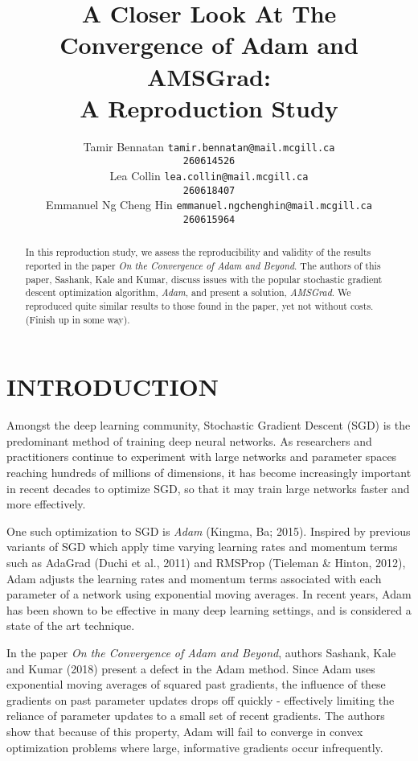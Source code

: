 \documentclass[letterpaper, 10 pt, conference]{ieeeconf}  %
\title{\LARGE \bf
A Closer Look At The Convergence of Adam and AMSGrad:\\A Reproduction Study
}
\author{ 
	\parbox{2 in}{\centering Tamir Bennatan
         {\tt\small tamir.bennatan@mail.mcgill.ca\\}
         {\tt\small 260614526}}
         \hspace*{ 0.3 in}
         \parbox{2 in}{\centering Lea Collin
         {\tt\small lea.collin@mail.mcgill.ca\\}
         {\tt\small 260618407}}
         \hspace*{0.3 in}
         \parbox{2 in}{\centering Emmanuel Ng Cheng Hin
         {\tt\small emmanuel.ngchenghin@mail.mcgill.ca\\}
         {\tt\small 260615964}}
}
\begin{document}
\maketitle
\thispagestyle{empty}
\pagestyle{empty}

\begin{abstract}
In this reproduction study, we assess the reproducibility and validity of the results reported in the paper \emph{On the Convergence of Adam and Beyond}. The authors of this paper, Sashank, Kale and Kumar, discuss issues with the popular stochastic gradient descent optimization algorithm, \emph{Adam}, and present a solution, \emph{AMSGrad}. We reproduced quite similar results to those found in the paper, yet not without costs. (Finish up in some way). 
\end{abstract}

\section{INTRODUCTION}

Amongst the deep learning community, Stochastic Gradient Descent (SGD) is the predominant method of training deep neural networks. As researchers and practitioners continue to experiment with large networks and parameter spaces reaching hundreds of millions of dimensions, it has become increasingly important in recent decades to optimize SGD, so that it may train large networks faster and more effectively. 

One such optimization to SGD is \emph{Adam} (Kingma, Ba; 2015). Inspired by previous variants of SGD which  apply time varying learning rates and momentum terms such as AdaGrad (Duchi et al.,
2011) and RMSProp (Tieleman \& Hinton, 2012), Adam adjusts the learning rates and momentum terms associated with each parameter of a network using exponential moving averages. In recent years, Adam has been shown to be effective in many deep learning settings, and is considered a state of the art technique. 

In the paper \emph{On the Convergence of Adam and Beyond}, authors Sashank, Kale and Kumar (2018) present a defect in the Adam method. Since Adam uses exponential moving averages of squared past gradients, the influence of these gradients on past parameter updates drops off quickly - effectively limiting the reliance of parameter updates to a small set of recent gradients. The authors show that because of this property, Adam will fail to converge in convex optimization problems where large, informative gradients occur infrequently. 
\end{document}
